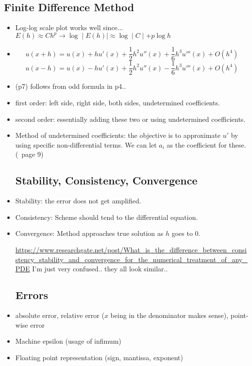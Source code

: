 \documentclass{article}
\theoremstyle{remark}
\begin{document}
    \subsection*{Finite Difference Method}
    \begin{itemize}
\item Log-log scale plot works well since... $E(h)\approx Ch^p\to \log\mid E(h)\mid\approx \log\mid C\mid + p\log h$
\item $$u(x+h)=u(x)+hu'(x)+\frac 12 h^2 u''(x)+\frac 16 h^3u'''(x)+O(h^4)$$
$$u(x-h)=u(x)-hu'(x)+\frac 12h^2u''(x)-\frac 16h^3 u'''(x)+O(h^4)$$
\item (p7) follows from odd formula in p4..
\item first order: left side, right side, both sides, undetermined coefficients.
\item second order: essentially adding these two or using undetermined coefficients.
\item Method of undetermined coefficients: the objective is to approximate $u'$ by using specific non-differential terms. We can let $a_i$ as the coefficient for these. (~page 9)

\subsection*{Stability, Consistency, Convergence}
    \item Stability: the error does not get amplified.
    
    \item Consistency: Scheme should tend to the differential equation.

    \item Convergence: Method approaches true solution as $h$ goes to $0$.


\url{https://www.researchgate.net/post/What_is_the_difference_between_consistency_stability_and_convergence_for_the_numerical_treatment_of_any_PDE} I'm just very confused.. they all look similar..

\subsection*{Errors}
\item absolute error, relative error ($x$ being in the denominator makes sense), point-wise error
\item Machine epsilon (usage of infimum)
\item Floating point representation (sign, mantissa, exponent)


\end{itemize}
\end{document}
